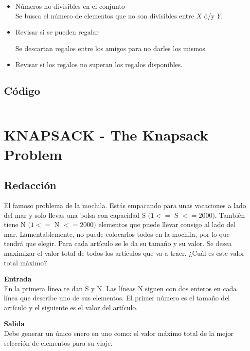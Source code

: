 \documentclass[12pt]{article}
\begin{document}
        \begin{itemize}
            \item Números no divisibles en el conjunto  \\
            
            Se busca el número de elementos que no son divisibles entre $X$ ó/y $Y$. 
            
            \item Revisar si se pueden regalar
            
            Se descartan regalos entre los amigos para no darles los mismos. 
            
            \item Revisar si los regalos no superan los regalos disponibles.
        \end{itemize}
\newpage
    \subsection{Código}
    	\inputminted{c++}{Code/2.c}

\newpage
  \section{KNAPSACK - The Knapsack Problem}
  
    \subsection{Redacción}
        El famoso problema de la mochila. Estás empacando para unas vacaciones a lado del mar y solo llevas una bolsa con capacidad S $(1<=$ S $<=2000)$. También tiene N $(1<=$ N $<=2000)$ elementos que puede llevar consigo al lado del mar. Lamentablemente, no puede colocarlos todos en la mochila, por lo que tendrá que elegir. Para cada artículo se le da su tamaño y su valor. Se desea maximizar el valor total de todos los artículos que va a traer. ¿Cuál es este valor total máximo?

        \begin{multicols}{2}
            \noindent\textbf{Entrada} \\ 
            En la primera línea te dan S y N. Las líneas N siguen con dos enteros en cada línea que describe uno de sus elementos. El primer número es el tamaño del artículo y el siguiente es el valor del artículo.
            
        \columnbreak
            
            \noindent\textbf{Salida} \\
            Debe generar un único enero en uno como: el valor máximo total de la mejor selección de elementos para su viaje.
        \end{multicols}
        
\end{document}
